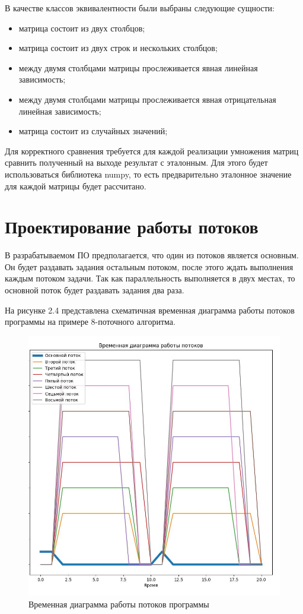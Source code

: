 В качестве классов эквивалентности были выбраны следующие сущности:
\begin{itemize}
	\item матрица состоит из двух столбцов;
	\item матрица состоит из двух строк и нескольких столбцов;
	\item между двумя столбцами матрицы прослеживается явная линейная зависимость;
	\item между двумя столбцами матрицы прослеживается явная отрицательная линейная зависимость;
	\item матрица состоит из случайных значений;
\end{itemize}

Для корректного сравнения требуется для каждой реализации умножения матриц
сравнить полученный на выходе результат с эталонным. Для этого будет использоваться библиотека numpy,
то есть предварительно эталонное значение для каждой матрицы будет рассчитано.

\section{Проектирование работы потоков}
В разрабатываемом ПО предполагается, что один из потоков является основным.
Он будет раздавать задания остальным потоком, после этого ждать выполнения каждым потоком задачи.
Так как параллельность выполняется в двух местах, то основной поток будет раздавать задания два раза.

На рисунке 2.4 представлена схематичная временная диаграмма работы потоков программы на примере
8-поточного алгоритма.

\FloatBarrier
\begin{figure}[hp]
	\label{classic}
	\begin{center}
		\includegraphics[width=\linewidth]{inc/threads.jpg}
	\end{center}
	\caption{Временная диаграмма работы потоков программы}
\end{figure}
\FloatBarrier

